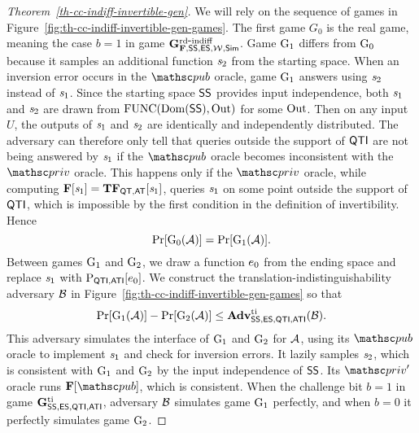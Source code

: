 	\begin{proof}[Theorem~\ref{th-cc-indiff-invertible-gen}] We will rely on the sequence of games in Figure~\ref{fig:th-cc-indiff-invertible-gen-games}. The first game $G_0$ is the real game, meaning the case $b=1$ in game $\mathbf{G}^{\mathrm{rd\mbox{-}indiff}}_{\mathbf{F},\mathsf{SS},\mathsf{ES},{\cal W},\mathsf{Sim}}$. 
	Game $\textnormal{G}_1$ differs from $\textnormal{G}_0$ because it samples an additional function $\mathit{s}_2$ from the starting space. When an inversion error occurs in the $\pub$ oracle, game $\textnormal{G}_1$ answers using $\mathit{s}_2$ instead of $\mathit{s}_1$. Since the starting space $\mathsf{SS}$ provides input independence, both $\mathit{s}_1$ and $\mathit{s}_2$ are drawn from $\mathrm{FUNC}(\mathrm{Dom}(\mathsf{SS}),\mathrm{Out})$ for some $\mathrm{Out}$. Then on any input $U$, the outputs of $\mathit{s}_1$ and $\mathit{s}_2$ are identically and independently distributed. The adversary can therefore only tell that queries outside the support of $\mathsf{QTI}$ are not being answered by $\mathit{s}_1$ if the $\pub$ oracle becomes inconsistent with the $\priv$ oracle. This happens only if the $\priv$ oracle, while computing $\mathbf{F}[\mathit{s}_1] = \mathbf{TF}_{\mathsf{QT},\mathsf{AT}}[\mathit{s}_1]$, queries $\mathit{s}_1$ on some point outside the support of $\mathsf{QTI}$, which is impossible by the first condition in the definition of invertibility.  Hence
	\[\Pr[\textnormal{G}_0(\mathcal{A})] = \Pr[\textnormal{G}_1(\mathcal{A})].\]
	Between games $\textnormal{G}_1$ and $\textnormal{G}_2$, we draw a function $e_0$ from the ending space and replace $\mathit{s}_1$ with $\mathrm{P}_{\mathsf{QTI},\mathsf{ATI}}[e_0]$.
	We construct the translation-indistinguishability adversary $\mathcal{B}$ in Figure~\ref{fig:th-cc-indiff-invertible-gen-games} so that 
	\[ 	\Pr[\textnormal{G}_1(\mathcal{A})]-\Pr[\textnormal{G}_2(\mathcal{A})] \leq \mathbf{Adv}^{\mathrm{ti}}_{\mathsf{SS},\mathsf{ES},\mathsf{QTI},\mathsf{ATI}}(\mathcal{B}). \]
	This adversary simulates the interface of $\textnormal{G}_1$ and $\textnormal{G}_2$ for $\mathcal{A}$, using its $\pub$ oracle to implement $\mathit{s}_1$ and check for inversion errors. It lazily samples $\mathit{s}_2$, which is consistent with $\textnormal{G}_1$ and $\textnormal{G}_2$ by the input independence of $\mathsf{SS}$. Its $\priv'$ oracle runs $\construct{F}[\pub]$, which is consistent. 
	When the challenge bit $b = 1$ in game $\mathbf{G}^{\mathrm{ti}}_{\mathsf{SS},\mathsf{ES},\mathsf{QTI},\mathsf{ATI}}$, adversary $\mathcal{B}$ simulates game $\textnormal{G}_1$ perfectly, and when $b=0$ it perfectly simulates game $\textnormal{G}_2$.
	

\end{proof}
